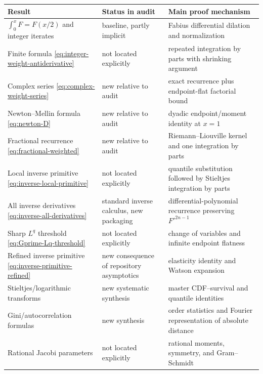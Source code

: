 \documentclass[11pt,oneside]{article}
\theoremstyle{definition}
\theoremstyle{remark}
\begin{document}
\begin{longtable}{@{}p{}p{}p{}@{}}
\toprule
Result & Status in audit & Main proof mechanism\\
\midrule
\endhead
$\int_0^xF=F(x/2)$ and integer iterates
& baseline, partly implicit
& Fabius differential dilation and normalization\\
\addlinespace
Finite formula \eqref{eq:integer-weight-antiderivative}
& not located explicitly
& repeated integration by parts with shrinking argument\\
\addlinespace
Complex series \eqref{eq:complex-weight-series}
& new relative to audit
& exact recurrence plus endpoint-flat factorial bound\\
\addlinespace
Newton--Mellin formula \eqref{eq:newton-D}
& new relative to audit
& dyadic endpoint/moment identity at $x=1$\\
\addlinespace
Fractional recurrence \eqref{eq:fractional-weighted}
& new relative to audit
& Riemann--Liouville kernel and one integration by parts\\
\addlinespace
Local inverse primitive \eqref{eq:inverse-local-primitive}
& not located explicitly
& quantile substitution followed by Stieltjes integration by parts\\
\addlinespace
All inverse derivatives \eqref{eq:inverse-all-derivatives}
& standard inverse calculus, new packaging
& differential-polynomial recurrence preserving $F'^{2n-1}$\\
\addlinespace
Sharp $L^q$ threshold \eqref{eq:Gprime-Lq-threshold}
& not located explicitly
& change of variables and infinite endpoint flatness\\
\addlinespace
Refined inverse primitive \eqref{eq:inverse-primitive-refined}
& new consequence of repository asymptotics
& elasticity identity and Watson expansion\\
\addlinespace
Stieltjes/logarithmic transforms
& new systematic synthesis
& master CDF--survival and quantile identities\\
\addlinespace
Gini/autocorrelation formulas
& new synthesis
& order statistics and Fourier representation of absolute distance\\
\addlinespace
Rational Jacobi parameters
& not located explicitly
& rational moments, symmetry, and Gram--Schmidt\\
\bottomrule
\end{longtable}
\end{document}
